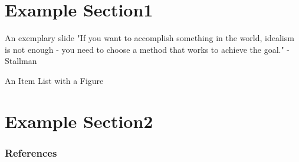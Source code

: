 \documentclass[10pt,aspectratio=43]{beamer}
\begin{document}

\title{\maintitle}
\disablefooter
\author{\FirstName~\LastName}
\institute{\Organisation \\
\href{\Website}{\Website}}%

\maketitle
\inserttoc

\enablefooter{\maintitle}

\section{Example Section1}

\begin{frame}{An exemplary slide}
"If you want to accomplish something in the world, idealism is not enough - you need to choose a method that works to achieve the goal." - Stallman \cite{refernce1,refernce2,refernce3,refernce4}
\end{frame}

\begin{frame}{An Item List with a Figure}
\end{frame}

\section{Example Section2}
\begin{frame}
\end{frame}

\begin{frame}[allowframebreaks]
\frametitle{References}
\footnotesize
%
%
\end{frame}
\end{document}

